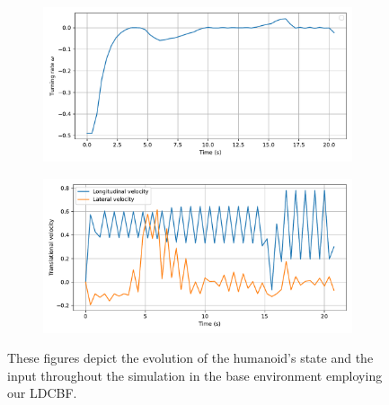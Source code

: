 \begin{figure}[H]
\begin{subfigure}{0.45\linewidth}
    \end{subfigure}
    \begin{subfigure}{0.45\linewidth}
        \centering
        \includegraphics[width=\linewidth]{figures/Simulations/sim1circles_delta/evolution_3.pdf}
    \end{subfigure}
    \hfill
    \begin{subfigure}{0.45\linewidth}
        \centering
        \includegraphics[width=\linewidth]{figures/Simulations/sim1circles_delta/evolution_1.pdf}
    \end{subfigure}
    \caption{These figures depict the evolution of the humanoid's state and the input throughout the simulation in the base environment employing our LDCBF.}
    \label{fig:sim1_delta_evol}
\end{figure}

